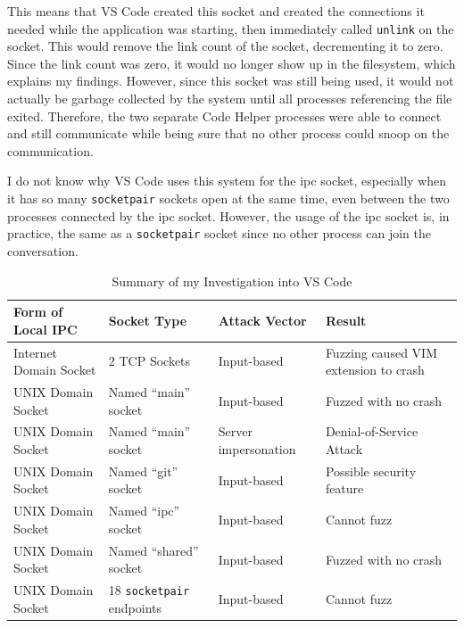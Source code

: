 This means that VS Code created this socket and created the connections it needed while the application was starting, then immediately called \texttt{unlink} on the socket.  This would remove the link count of the socket, decrementing it to zero.  Since the link count was zero, it would no longer show up in the filesystem, which explains my findings.  However, since this socket was still being used, it would not actually be garbage collected by the system until all processes referencing the file exited.  Therefore, the two separate Code Helper processes were able to connect and still communicate while being sure that no other process could snoop on the communication.

I do not know why VS Code uses this system for the ipc socket, especially when it has so many \texttt{socketpair} sockets open at the same time, even between the two processes connected by the ipc socket.  However, the usage of the ipc socket is, in practice, the same as a \texttt{socketpair} socket since no other process can join the conversation.

\begin{table}
\centering
\begin{scriptsize}
\begin{tabular}{ l | l | l | l }
\textbf{Form of Local IPC} & \textbf{Socket Type} & \textbf{Attack Vector} & \textbf{Result} \\ \hline
Internet Domain Socket & 2 TCP Sockets & Input-based & Fuzzing caused VIM extension to crash \\ \hline
UNIX Domain Socket & Named ``main'' socket & Input-based & Fuzzed with no crash \\ \hline
UNIX Domain Socket & Named ``main'' socket & Server impersonation & Denial-of-Service Attack \\ \hline
UNIX Domain Socket & Named ``git'' socket & Input-based & Possible security feature \\ \hline
UNIX Domain Socket & Named ``ipc'' socket & Input-based & Cannot fuzz \\ \hline
UNIX Domain Socket & Named ``shared'' socket & Input-based & Fuzzed with no crash \\ \hline
UNIX Domain Socket & 18 \texttt{socketpair} endpoints & Input-based & Cannot fuzz \\ \hline
\end{tabular}
\caption{Summary of my Investigation into VS Code}
\label{tab:codeData}
\end{scriptsize}
\end{table} 

